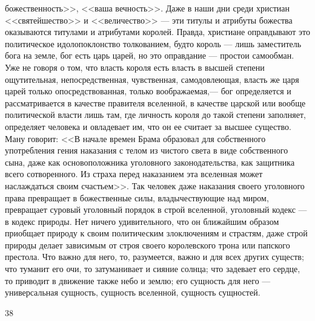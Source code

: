 \documentclass[12pt]{article}
\begin{document}
божественность>>, <<ваша вечность>>. Даже в наши дни среди христиан <<святейшество>> и <<величество>> --- эти титулы и атрибуты божества оказываются титулами и атрибутами королей. Правда, христиане оправдывают это политическое идолопоклонство толкованием, будто король --- лишь заместитель бога на земле, бог есть царь царей, но это оправдание --- простои самообман. Уже не говоря о том, что власть короля есть власть в высшей степени ощутительная, непосредственная, чувственная, самодовлеющая, власть же царя царей только опосредствованная, только воображаемая,--- бог определяется и рассматривается в качестве правителя вселенной, в качестве царской или вообще политической власти лишь там, где личность короля до такой степени заполняет, определяет человека и овладевает им, что он ее считает за высшее существо. Ману говорит: <<В начале времен Брама образовал для собственного употребления гения наказания с телом из чистого света в виде собственного сына, даже как основоположника уголовного законодательства, как защитника всего сотворенного. Из страха перед наказанием эта вселенная может наслаждаться своим счастьем>>. Так человек даже наказания своего уголовного права превращает в божественные силы, владычествующие над миром, превращает суровый уголовный порядок в строй вселенной, уголовный кодекс --- в кодекс природы. Нет ничего удивительного, что он ближайшим образом приобщает природу к своим политическим злоключениям и страстям, даже строй природы делает зависимым от строя своего королевского трона или папского престола. Что важно для него, то, разумеется, важно и для всех других существ; что туманит его очи, то затуманивает и сияние солнца; что задевает его сердце, то приводит в движение также небо и землю; его сущность для него --- универсальная сущность, сущность вселенной, сущность сущностей.



38
\end{document}
